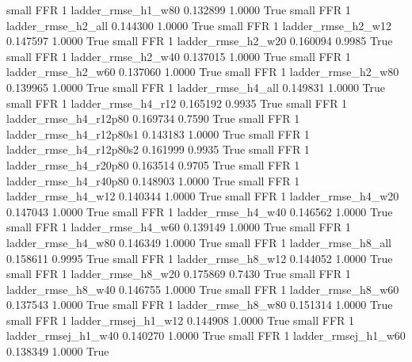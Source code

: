      small      FFR                 1       ladder_rmse_h1_w80   0.132899      1.0000    True
     small      FFR                 1       ladder_rmse_h2_all   0.144300      1.0000    True
     small      FFR                 1       ladder_rmse_h2_w12   0.147597      1.0000    True
     small      FFR                 1       ladder_rmse_h2_w20   0.160094      0.9985    True
     small      FFR                 1       ladder_rmse_h2_w40   0.137015      1.0000    True
     small      FFR                 1       ladder_rmse_h2_w60   0.137060      1.0000    True
     small      FFR                 1       ladder_rmse_h2_w80   0.139965      1.0000    True
     small      FFR                 1       ladder_rmse_h4_all   0.149831      1.0000    True
     small      FFR                 1       ladder_rmse_h4_r12   0.165192      0.9935    True
     small      FFR                 1    ladder_rmse_h4_r12p80   0.169734      0.7590    True
     small      FFR                 1  ladder_rmse_h4_r12p80s1   0.143183      1.0000    True
     small      FFR                 1  ladder_rmse_h4_r12p80s2   0.161999      0.9935    True
     small      FFR                 1    ladder_rmse_h4_r20p80   0.163514      0.9705    True
     small      FFR                 1    ladder_rmse_h4_r40p80   0.148903      1.0000    True
     small      FFR                 1       ladder_rmse_h4_w12   0.140344      1.0000    True
     small      FFR                 1       ladder_rmse_h4_w20   0.147043      1.0000    True
     small      FFR                 1       ladder_rmse_h4_w40   0.146562      1.0000    True
     small      FFR                 1       ladder_rmse_h4_w60   0.139149      1.0000    True
     small      FFR                 1       ladder_rmse_h4_w80   0.146349      1.0000    True
     small      FFR                 1       ladder_rmse_h8_all   0.158611      0.9995    True
     small      FFR                 1       ladder_rmse_h8_w12   0.144052      1.0000    True
     small      FFR                 1       ladder_rmse_h8_w20   0.175869      0.7430    True
     small      FFR                 1       ladder_rmse_h8_w40   0.146755      1.0000    True
     small      FFR                 1       ladder_rmse_h8_w60   0.137543      1.0000    True
     small      FFR                 1       ladder_rmse_h8_w80   0.151314      1.0000    True
     small      FFR                 1      ladder_rmsej_h1_w12   0.144908      1.0000    True
     small      FFR                 1      ladder_rmsej_h1_w40   0.140270      1.0000    True
     small      FFR                 1      ladder_rmsej_h1_w60   0.138349      1.0000    True

